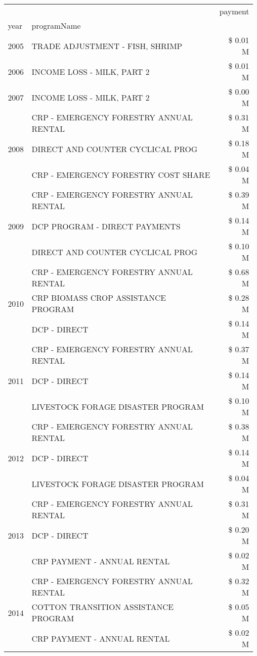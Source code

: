 \begin{tabular}{llr}
\toprule
 &  & payment \\
year & programName &  \\
\midrule
2005 & TRADE ADJUSTMENT - FISH, SHRIMP & \$ 0.01 M \\
\cline{1-3}
2006 & INCOME LOSS - MILK, PART 2 & \$ 0.01 M \\
\cline{1-3}
2007 & INCOME LOSS - MILK, PART 2 & \$ 0.00 M \\
\cline{1-3}
\multirow[t]{3}{*}{2008} & CRP - EMERGENCY FORESTRY ANNUAL RENTAL & \$ 0.31 M \\
 & DIRECT AND COUNTER CYCLICAL PROG & \$ 0.18 M \\
 & CRP - EMERGENCY FORESTRY COST SHARE & \$ 0.04 M \\
\cline{1-3}
\multirow[t]{3}{*}{2009} & CRP - EMERGENCY FORESTRY ANNUAL RENTAL & \$ 0.39 M \\
 & DCP PROGRAM - DIRECT PAYMENTS & \$ 0.14 M \\
 & DIRECT AND COUNTER CYCLICAL PROG & \$ 0.10 M \\
\cline{1-3}
\multirow[t]{3}{*}{2010} & CRP - EMERGENCY FORESTRY ANNUAL RENTAL & \$ 0.68 M \\
 & CRP BIOMASS CROP ASSISTANCE PROGRAM & \$ 0.28 M \\
 & DCP - DIRECT & \$ 0.14 M \\
\cline{1-3}
\multirow[t]{3}{*}{2011} & CRP - EMERGENCY FORESTRY ANNUAL RENTAL & \$ 0.37 M \\
 & DCP - DIRECT & \$ 0.14 M \\
 & LIVESTOCK FORAGE DISASTER PROGRAM & \$ 0.10 M \\
\cline{1-3}
\multirow[t]{3}{*}{2012} & CRP - EMERGENCY FORESTRY ANNUAL RENTAL & \$ 0.38 M \\
 & DCP - DIRECT & \$ 0.14 M \\
 & LIVESTOCK FORAGE DISASTER PROGRAM & \$ 0.04 M \\
\cline{1-3}
\multirow[t]{3}{*}{2013} & CRP - EMERGENCY FORESTRY ANNUAL RENTAL & \$ 0.31 M \\
 & DCP - DIRECT & \$ 0.20 M \\
 & CRP PAYMENT - ANNUAL RENTAL & \$ 0.02 M \\
\cline{1-3}
\multirow[t]{3}{*}{2014} & CRP - EMERGENCY FORESTRY ANNUAL RENTAL & \$ 0.32 M \\
 & COTTON TRANSITION ASSISTANCE PROGRAM & \$ 0.05 M \\
 & CRP PAYMENT - ANNUAL RENTAL & \$ 0.02 M \\

\end{tabular}
